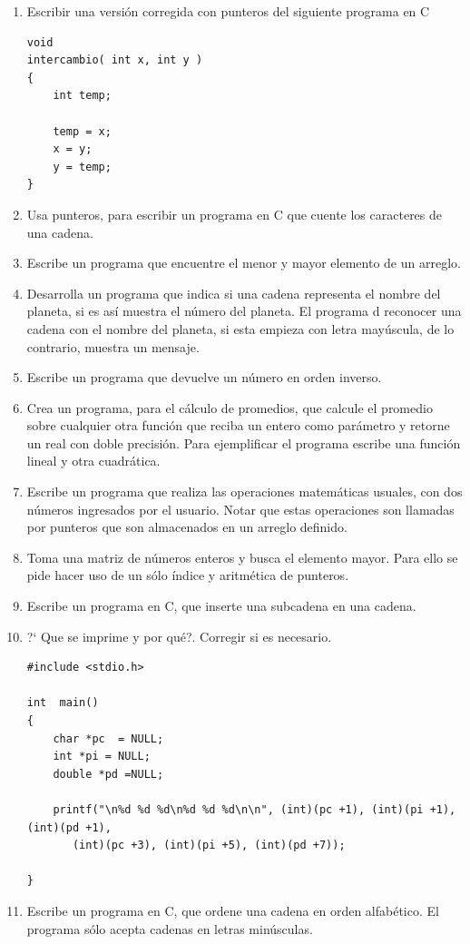 \documentclass[11pt,a4paper]{article}
\newcounter{num}
\begin{document}
\begin{enumerate}
\item Escribir una versi\'on corregida con punteros del siguiente programa en C

\begin{verbatim}
void
intercambio( int x, int y )
{
	int temp;

	temp = x;
	x = y;
	y = temp;
}
\end{verbatim}
\item Usa  punteros, para escribir un programa en C que cuente los caracteres de una cadena.
\item Escribe un programa que encuentre el menor y mayor elemento de un  arreglo.
\item Desarrolla un programa que indica si una cadena representa el nombre del planeta, si es as\'i muestra el n\'umero del planeta.  El programa d reconocer una cadena con el nombre del planeta, si esta empieza con letra may\'uscula, de lo contrario, muestra un mensaje.
\item Escribe un programa que devuelve un n\'umero en orden inverso.
\item Crea un programa, para el c\'alculo de promedios, que calcule el promedio sobre cualquier otra funci\'on que reciba un entero como par\'ametro y retorne un real con doble precisi\'on. Para ejemplificar el programa escribe una funci\'on lineal y otra cuadr\'atica.
\item Escribe un programa que realiza las operaciones matem\'aticas usuales, con dos n\'umeros ingresados por el usuario. Notar que estas operaciones son llamadas por punteros que son almacenados en un arreglo definido.
\item Toma una matriz de n\'umeros enteros y busca el elemento mayor. Para ello se pide hacer uso de un s\'olo \'indice y aritm\'etica de punteros.

\item Escribe un programa en C, que inserte una subcadena en una cadena.
\item ?` Que se imprime y por qu\'e?. Corregir si es necesario.

\begin{verbatim}
#include <stdio.h>

int  main()
{
    char *pc  = NULL;
    int *pi = NULL;
    double *pd =NULL;
    
    printf("\n%d %d %d\n%d %d %d\n\n", (int)(pc +1), (int)(pi +1), (int)(pd +1),
	   (int)(pc +3), (int)(pi +5), (int)(pd +7));
    
}
\end{verbatim}
\item Escribe un programa en C, que ordene una cadena en orden alfab\'etico. El programa s\'olo acepta cadenas en letras min\'usculas.


\end{enumerate}
\end{document}
